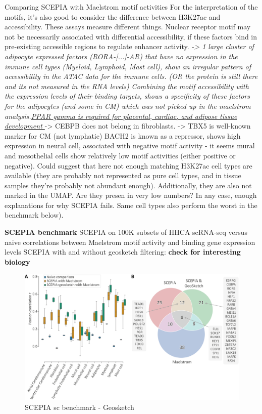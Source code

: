 
Comparing SCEPIA with Maelstrom motif activities
For the interpretation of the motifs, it's also good to consider the difference between H3K27ac and accessibility. These assays measure different things. Nuclear receptor motif may not be necessarily associated with differential accessibility, if these factors bind in pre-existing accessible regions to regulate enhancer activity.
\textit{-> 1 large cluster of adipocyte expressed factors (RORA-[...]-AR) that have no expression in the immune cell types (Myeloid, Lymphoid, Mast cell), show an irregular pattern of accessibility in the ATAC data for the immune cells. (OR the protein is still there and its not measured in the RNA levels) Combining the motif accessibility with the expression levels of their binding targets, shows a specificity of these factors for the adipocytes (and some in CM) which was not picked up in the maelstrom analysis.\href{https://www.cell.com/molecular-cell/fulltext/S1097-2765(00)80209-9?_returnURL=https\%3A\%2F\%2Flinkinghub.elsevier.com\%2Fretrieve\%2Fpii\%2FS1097276500802099\%3Fshowall\%3Dtrue}{PPAR gamma is required for placental, cardiac, and adipose tissue development }}
-> CEBPB does not belong in fibroblasts.
-> TBX5 is well-known marker for CM (not lymphatic)
BACH2 is known as a repressor, shows high expression in neural cell, associated with negative motif activity
- it seems mural and mesothelial cells show relatively low motif activities (either positive or negative). Could suggest that here not enough matching H3K27ac cell types are available (they are probably not represented as pure cell types, and in tissue samples they're probably not abundant enough). Additionally, they are also not marked in the UMAP. Are they presen in very low numbers? In any case, enough explanations for why SCEPIA fails. Same cell types also perform the worst in the benchmark below).

\textbf{SCEPIA benchmark}
SCEPIA on 100K subsets of HHCA scRNA-seq versus naive correlations between Maelstrom motif activity and binding gene expression levels
SCEPIA with and without geosketch filtering: \textbf{check for interesting biology} 
\begin{figure}
    \centering
    \includegraphics[width=0.75\linewidth]{Fig_OverlappingHitsBetweenSCEPIAGEOANDMAELSTROM_v3.png}
    \caption{SCEPIA sc benchmark - Geosketch}
    \label{fig:sc_benchmark}
\end{figure}

